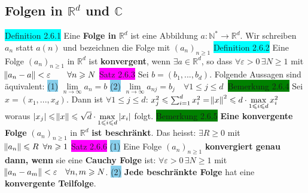 \documentclass[landscape, 10pt]{article}
\newcommand{\R}{\mathbb{R}}
\newcommand{\N}{\mathbb{N}}
\newcommand{\C}{\mathbb{C}}
\begin{document}
\begin{multicols}{3}
\subsection{Folgen in $\R^d$ und $\C$}
\colorbox{cyan}{Definition 2.6.1} Eine \textbf{Folge in} 
                \textcolor{NavyBlue}{$\R^d$} ist eine Abbildung 
                \textcolor{NavyBlue}{$a:\N^*\longrightarrow\R^d$}. 
                Wir schreiben $a_n$ statt $a(n)$ und bezeichnen 
         die Folge mit \textcolor{NavyBlue}{$(a_n)_{n\geqslant1}$}
\colorbox{cyan}{Definition 2.6.2} Eine Folge $(a_n)_{n\geqslant1}$ in $\R^d$ 
                ist \textbf{konvergent}, wenn 
                \textcolor{NavyBlue}{$\exists a\in\R^d$}, so dass
                \textcolor{NavyBlue}{$\forall\varepsilon >0\,\exists N\geqslant1$} mit 
         \textcolor{NavyBlue}{$\norm{a_n-a}<\varepsilon\qquad\forall n\geqslant N$}
\colorbox{magenta}{Satz 2.6.3} Sei \textcolor{NavyBlue}{$b=(b_1,...,b_d)$}. 
                Folgende Aussagen sind äquivalent:
                \colorbox{SkyBlue}{(1)} \textcolor{NavyBlue}{$\lim\limits_{n\to\infty}a_n=b$}
                \colorbox{SkyBlue}{(2)} 
                \textcolor{NavyBlue}{
                $\lim\limits_{n\to\infty}a_{nj}=b_j\quad\forall 1\leqslant j\leqslant d$}\
\colorbox{green}{Bemerkung 2.6.4} Sei \textcolor{NavyBlue}{$x=(x_1,...,x_d)$}. Dann ist 
                \textcolor{NavyBlue}{$\forall 1\leqslant j\leqslant d$:
                $x^2_j\leqslant\sum_{i=1}^{d}x_i^2=\norm{x}^2\leqslant 
                d\cdot \max\limits_{1\leqslant i\leqslant d}x_i^2$} woraus 
                 \textcolor{NavyBlue}{$|x_j|\leqslant \norm{x}\leqslant
                \sqrt{d}\cdot\max\limits_{1\leqslant i\leqslant d}|x_i|$} folgt.
\colorbox{green}{Bemerkung 2.6.5} \textbf{Eine konvergente Folge} $(a_n)_{n\geqslant1}$ in 
                $\R^d$ \textbf{ist beschränkt}. Das heisst: 
                \textcolor{NavyBlue}{$\exists R\geqslant0$} mit 
                \textcolor{NavyBlue}{$\norm{a_n}\leqslant R\enspace\forall n\geqslant1$}
\colorbox{magenta}{Satz 2.6.6} \colorbox{SkyBlue}{(1)} Eine Folge $(a_n)_{n\geqslant1}$ 
                \textbf{konvergiert genau dann, wenn} sie eine 
                \textbf{Cauchy Folge} ist: 
                \textcolor{NavyBlue}{$\forall\varepsilon >0\,\exists N\geqslant1$} mit 
         \textcolor{NavyBlue}{$\norm{a_n-a_m}<\varepsilon\quad\forall n,m\geqslant N$}.
                \colorbox{SkyBlue}{(2)} \textbf{Jede beschränkte Folge} hat eine 
                \textbf{konvergente Teilfolge}.

\end{multicols}
\end{document}
